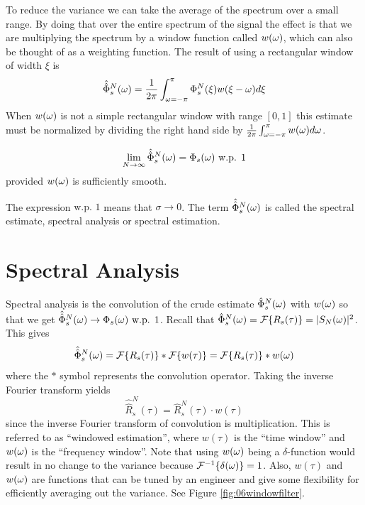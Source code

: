 \documentclass[lecture,12pt,]{pcms-l}
\begin{document}
To reduce the variance we can take the average of the spectrum over a small range. By doing that over the entire spectrum of the signal the effect is that we are multiplying the spectrum by a window function called $w(\omega)$, which can also be thought of as a weighting function. The result of using a rectangular window of width $\xi$ is
$$\hat{\hat{\Phi}}_s^N(\omega) = \frac{1}{2\pi}\int_{\omega=-\pi}^\pi \Phi_s^N(\xi)w(\xi-\omega)d\xi$$
When $w(\omega)$ is not a simple rectangular window with range $[0,1]$ this estimate must be normalized by dividing the right hand side by $\frac{1}{2\pi}\int_{\omega=-\pi}^\pi w(\omega)d\omega$.

\begin{theorem}
$$\lim_{N\to\infty}\hat{\hat{\Phi}}_s^N(\omega) = \Phi_s(\omega) \text{ w.p. } 1$$
provided $w(\omega)$ is sufficiently smooth.
\end{theorem}
The expression $\text{w.p. } 1$ means that $\sigma\to 0$. The term $\hat{\hat{\Phi}}_s^N(\omega)$ is called the spectral estimate, spectral analysis or spectral estimation.

\section{Spectral Analysis}
Spectral analysis is the convolution of the crude estimate $\hat{\Phi}_s^N(\omega)$ with $w(\omega)$ so that we get $\hat{\hat{\Phi}}_s^N(\omega) \to \Phi_s(\omega) \text{ w.p. } 1$. Recall that $\hat{\Phi}_s^N(\omega) = \mathcal{F}\{R_s(\tau)\} = |S_N(\omega)|^2$. This gives
$$\hat{\hat{\Phi}}_s^N(\omega) = \mathcal{F}\{R_s(\tau)\} * \mathcal{F}\{w(\tau)\} = \mathcal{F}\{R_s(\tau)\} * w(\omega)$$
where the $*$ symbol represents the convolution operator. Taking the inverse Fourier transform yields
$$\hat{\hat{R}}_s^N(\tau) = \hat{R}_s^N(\tau)\cdot w(\tau)$$
since the inverse Fourier transform of convolution is multiplication. This is referred to as ``windowed estimation'', where $w(\tau)$ is the ``time window'' and $w(\omega)$ is the ``frequency window''. Note that using $w(\omega)$ being a $\delta$-function would result in no change to the variance because $\mathcal{F}^{-1}\{\delta(\omega)\} = 1$. Also, $w(\tau)$ and $w(\omega)$ are functions that can be tuned by an engineer and give some flexibility for efficiently averaging out the variance. See Figure \ref{fig:06windowfilter}.
\end{document}
